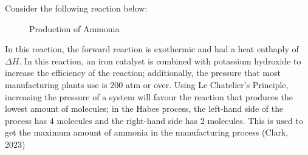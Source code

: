 Consider the following reaction below: 

\begin{figure}[htp]
    \centering
    
    \caption{Production of Ammonia}
    \label{fig:enter-label}
\end{figure}

\newpage

In this reaction, the forward reaction is exothermic and had a heat enthaply of \begin{math}\Delta H \end{math}. In this reaction, an iron catalyst is combined with potassium hydroxide to increase the efficiency of the reaction; additionally, the pressure that most manufacturing plants use is 200 atm or over. Using Le Chatelier’s Principle, increasing the pressure of a system will favour the reaction that produces the lowest amount of molecules; in the Habes process, the left-hand side of the process has 4 molecules and the right-hand side has 2 molecules. This is used to get the maximum amount of ammonia in the manufacturing process (Clark, 2023)

